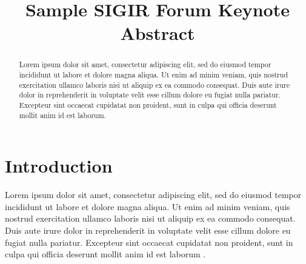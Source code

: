 \documentclass[keynote]{sigirforum}
\begin{document}
\title{Sample SIGIR Forum Keynote Abstract}


\maketitle 
\begin{abstract}
Lorem ipsum dolor sit amet, consectetur adipiscing elit, sed do eiusmod tempor incididunt ut labore et dolore magna aliqua. Ut enim ad minim veniam, quis nostrud exercitation ullamco laboris nisi ut aliquip ex ea commodo consequat. Duis aute irure dolor in reprehenderit in voluptate velit esse cillum dolore eu fugiat nulla pariatur. Excepteur sint occaecat cupidatat non proident, sunt in culpa qui officia deserunt mollit anim id est laborum.
\end{abstract}

\section{Introduction}

Lorem ipsum dolor sit amet, consectetur adipiscing elit, sed do eiusmod tempor incididunt ut labore et dolore magna aliqua. Ut enim ad minim veniam, quis nostrud exercitation ullamco laboris nisi ut aliquip ex ea commodo consequat. Duis aute irure dolor in reprehenderit in voluptate velit esse cillum dolore eu fugiat nulla pariatur. Excepteur sint occaecat cupidatat non proident, sunt in culpa qui officia deserunt mollit anim id est laborum \citep{forum}.


\end{document}
